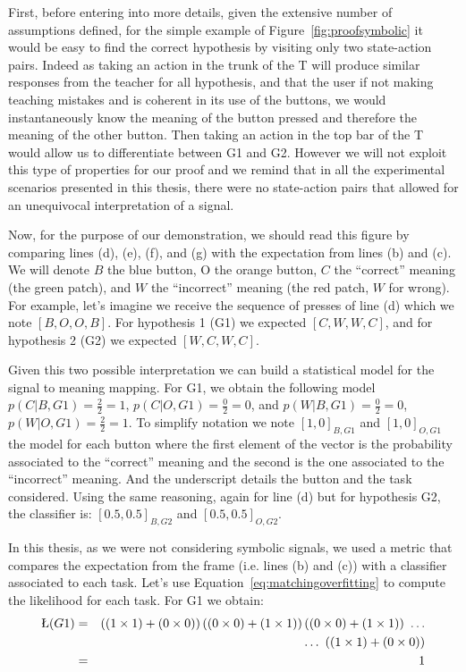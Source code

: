 First, before entering into more details, given the extensive number of assumptions defined, for the simple example of Figure~\ref{fig:proofsymbolic} it would be easy to find the correct hypothesis by visiting only two state-action pairs. Indeed as taking an action in the trunk of the T will produce similar responses from the teacher for all hypothesis, and that the user if not making teaching mistakes and is coherent in its use of the buttons, we would instantaneously know the meaning of the button pressed and therefore the meaning of the other button. Then taking an action in the top bar of the T would allow us to differentiate between G1 and G2. However we will not exploit this type of properties for our proof and we remind that in all the experimental scenarios presented in this thesis, there were no state-action pairs that allowed for an unequivocal interpretation of a signal.

Now, for the purpose of our demonstration, we should read this figure by comparing lines (d), (e), (f), and (g) with the expectation from lines (b) and (c). We will denote $B$ the blue button, O the orange button, $C$ the ``correct'' meaning (the green patch), and $W$ the ``incorrect'' meaning (the red patch, $W$ for wrong). For example, let's imagine we receive the sequence of presses of line (d) which we note $[B,O,O,B]$. For hypothesis 1 (G1) we expected $[C,W,W,C]$, and for hypothesis 2 (G2) we expected $[W,C,W,C]$. 

Given this two possible interpretation we can build a statistical model for the signal to meaning mapping. For G1, we obtain the following model $p(C|B, G1) = \frac{2}{2} = 1$, $p(C|O, G1) = \frac{0}{2} = 0$, and $p(W|B, G1) = \frac{0}{2} = 0$, $p(W|O, G1) = \frac{2}{2} = 1$. To simplify notation we note $[1,0]_{B,G1}$ and $[1,0]_{O,G1}$ the model for each button where the first element of the vector is the probability associated to the ``correct'' meaning and the second is the one associated to the ``incorrect'' meaning. And the underscript details the button and the task considered. Using the same reasoning, again for line (d) but for hypothesis G2, the classifier is: $[0.5,0.5]_{B,G2}$ and $[0.5,0.5]_{O,G2}$.

In this thesis, as we were not considering symbolic signals, we used a metric that compares the expectation from the frame (i.e. lines (b) and (c)) with a classifier associated to each task. Let's use Equation~\ref{eq:matchingoverfitting} to compute the likelihood for each task. For G1 we obtain:
%
\begin{eqnarray}
\L(G1) &=& \left((1\times1)+(0\times0)\right)\left((0\times0)+(1\times1)\right)\left((0\times0)+(1\times1)\right)~\ldots  \nonumber \\
&& \ldots~\left((1\times1)+(0\times0)\right)  \nonumber \\
&=& 1 \nonumber
\end{eqnarray}

